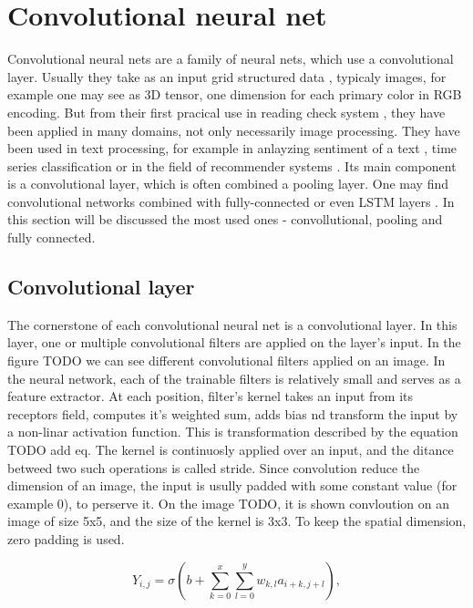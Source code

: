 \documentclass[twoside]{ctuthesis}
\theoremstyle{plain}
\theoremstyle{definition}
\theoremstyle{note}
\begin{document}
\chapter{Convolutional neural net}
Convolutional neural nets are a family of neural nets, which use a convolutional layer.
Usually they take as an input grid structured data \cite{DL_BOOK}, typicaly images, for example
 one may see as 3D tensor, one dimension for each primary color in RGB encoding. But from their
 first pracical use in reading check system \cite{CHECKS}, they have been applied in many 
 domains, not only necessarily image processing. They have been used in text processing, for
 example in anlayzing sentiment of a text \cite{SENTIMENT_CNN}, time series classification 
\cite{TS_CNN} or in the field of recommender systems \cite{REC_CNN}. Its main component is a
convolutional layer, which is often combined a pooling layer. One may find convolutional 
networks combined with fully-connected or even LSTM layers \cite{LSTM_CNN}. In this section
will be discussed the most used ones - convollutional, pooling and fully connected.


\section{Convolutional layer}
The cornerstone of each convolutional neural net is a convolutional layer. In this layer, 
one or multiple convolutional filters are applied on the layer's input. In the figure TODO we 
can see different convolutional filters applied on an image. In the neural network, each of the 
trainable filters is relatively small and serves as a feature extractor. At each position, 
filter's kernel takes an input from its receptors field, computes it's weighted sum, adds bias 
nd transform the input by a non-linar activation function. This is transformation described by 
the equation TODO add eq. The kernel is continuosly applied over an input, and the ditance
betweed two such operations is called stride. Since convolution reduce the dimension of an
image, the input is usully padded with some constant value (for example 0), to perserve it.
On the image TODO, it is shown convloution on an image of size 5x5, and the size of the 
kernel is 3x3. To keep the spatial dimension, zero padding is used.

\begin{equation} 
	Y_{i,j}=\sigma(b+\sum_{k=0}^{x}\sum_{l=0}^{y}w_{k,l}a_{i+k,j+l}),
\end{equation} 
\end{document}
